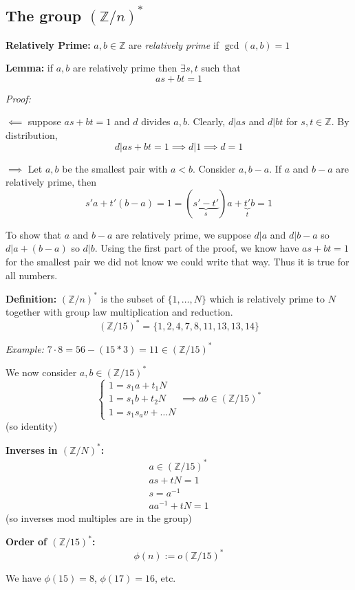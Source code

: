 \documentclass[12pt]{report}
\newcommand{\Z}{\mathbb{Z}}
\begin{document}
\subsection*{The group $(\Z/n)^*$}
\textbf{Relatively Prime:} $a, b \in \Z$ are \emph{relatively prime} if $\gcd(a, b) = 1$

\textbf{Lemma:} if $a, b$ are relatively prime then $\exists s, t$ such that 
\[as + bt =1\]

\emph{Proof:}

$\impliedby$ suppose $as + bt = 1$ and $d$ divides $a, b$. Clearly, $d | as$ and $d | bt$ for $s, t\in \Z$. By distribution, 
\[d| as + bt = 1 \implies d | 1 \implies d = 1\]

$\implies$ Let $a, b$ be the smallest pair with $a < b$. Consider $a, b - a$. If $a$ and $b-a$ are relatively prime, then 
\[s'a + t'(b- a) = 1 = (\underbrace{s'- t'}_s) a + \underbrace{t'}_tb = 1\]

To show that $a$ and $b- a$ are relatively prime, we suppose $d | a$ and $d | b-a$ so $d | a + (b-a)$ so $d |b$. Using the first part of the proof, we know have $as + bt =1$ for the smallest pair we did not know we could write that way. Thus it is true for all numbers.

\textbf{Definition:} $(\Z/n)^*$ is the subset of $\{1, \dots, N\}$ which is relatively prime to $N$ together with group law multiplication and reduction.
\[(\Z/15)^* = \{1, 2, 4, 7, 8, 11, 13, 13, 14\}\]

\emph{Example:} $7\cdot 8 = 56 - (15*3) = 11 \in (\Z/15)^* $

We now consider $a, b \in (\Z/15)^*$ 
\[\begin{cases}
    1 = s_1 a + t_1 N\\
    1 = s_1 b + t_2 N\\
    1 = s_1 s_av + \dots N
\end{cases} \implies ab \in (\Z/15)^*\] 
(so identity)

\textbf{Inverses in $(\Z/N)^*$:}
\begin{align*}
    a \in (\Z/15)^*\\
    as + tN = 1\\
    s = a^{-1}\\
    aa^{-1} + tN = 1
\end{align*}
(so inverses mod multiples are in the group)

\textbf{Order of $(\Z/15)^*$:} 
\[\phi(n) := o(\Z/15)^*\]

We have $\phi(15) = 8$, $\phi(17) = 16$, etc.
\end{document}

